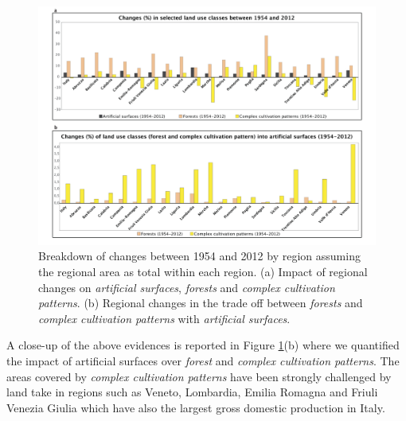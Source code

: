 \documentclass[APA,LATO1COL,doublespace]{WileyNJD-v2}
\begin{document}
\begin{figure}
    \centerline{ \includegraphics[width=450pt]{05_caso_nazionale_grafici} }
    \caption{Breakdown of changes between 1954 and 2012 by region assuming the regional area as total within each region.
             (a) Impact of regional changes on \textit{artificial surfaces}, \textit{forests} and \textit{complex cultivation patterns}.
             (b) Regional changes in the trade off between \textit{forests} and \textit{complex cultivation patterns} with \textit{artificial surfaces}.}
    \label{fig:caseIT_graphs}
\end{figure}

A close-up of the above evidences is reported in Figure \ref{fig:caseIT_graphs}(b) where we quantified the impact of artificial surfaces over \textit{forest} and \textit{complex cultivation patterns}. 
The areas covered by \textit{complex cultivation patterns} have been strongly challenged by land take in regions such as Veneto, Lombardia, Emilia Romagna and Friuli Venezia Giulia which have also the largest gross domestic production in Italy.
\end{document}
